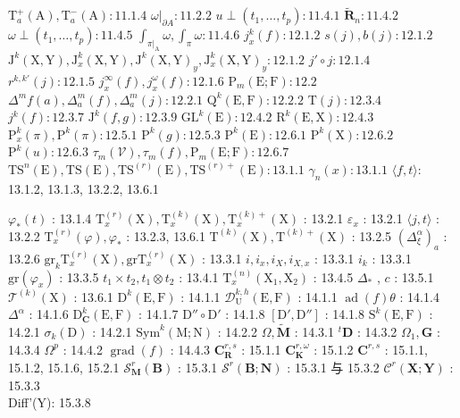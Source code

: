 \(\mathrm{T}_a^+(\mathrm{A}), \mathrm{T}_a^-(\mathrm{A}): 11.1.4\) \(\omega|_{\partial A}: 11.2.2\) \(u \perp (t_1, \ldots, t_p): 11.4.1\) \(\tilde{\mathbf{R}}_n: 11.4.2\) \(\omega \perp (t_1, \ldots, t_p): 11.4.5\) \(\int_{\pi|_{\mathrm{A}}} \omega, \int_{\pi} \omega: 11.4.6\) \(j_x^k(f): 12.1.2\) \(s(j), b(j): 12.1.2\) \(\mathrm{J}^k(\mathrm{X}, \mathrm{Y}), \mathrm{J}_x^k(\mathrm{X}, \mathrm{Y}), \mathrm{J}^k(\mathrm{X}, \mathrm{Y})_y, \mathrm{J}_x^k(\mathrm{X}, \mathrm{Y})_y: 12.1.2\) \(j' \circ j: 12.1.4\) \(r^{k, k'}(j): 12.1.5\) \(j_x^\infty(f), j_x^\omega(f): 12.1.6\) \(\mathrm{P}_m(\mathrm{E}; \mathrm{F}): 12.2\) \(\Delta^m f(a), \Delta_a^m(f), \Delta_a^m(j): 12.2.1\) \(\mathrm{Q}^k(\mathrm{E}, \mathrm{F}): 12.2.2\) \(\mathrm{T}(j): 12.3.4\) \(j^k(f): 12.3.7\) \(\mathrm{J}^k(f, g): 12.3.9\) \(\mathrm{GL}^k(\mathrm{E}): 12.4.2\) \(\mathrm{R}^k(\mathrm{E}, \mathrm{X}): 12.4.3\) \(\mathrm{P}_x^k(\pi), \mathrm{P}^k(\pi): 12.5.1\) \(\mathrm{P}^k(g): 12.5.3\) \(\mathrm{P}^k(\mathrm{E}): 12.6.1\) \(\mathrm{P}^k(\mathrm{X}): 12.6.2\) \(\mathrm{P}^k(u): 12.6.3\) \(\tau_m(\mathcal{V}), \tau_m(f), \mathrm{P}_m(\mathrm{E}; \mathrm{F}): 12.6.7\) \(\mathrm{TS}^n(\mathrm{E}), \mathrm{TS}(\mathrm{E}), \mathrm{TS}^{(r)}(\mathrm{E}), \mathrm{TS}^{(r)+}(\mathrm{E}): 13.1.1\) \(\gamma_n(x): 13.1.1\) \(\langle f, t\rangle\): 13.1.2, 13.1.3, 13.2.2, 13.6.1

\(\varphi_{*}(t)\) : 13.1.4 \(\mathrm{T}_x^{(r)}(\mathrm{X}), \mathrm{T}_x^{(k)}(\mathrm{X}), \mathrm{T}_x^{(k)+}(\mathrm{X})\) : 13.2.1 \(\varepsilon_x\) : 13.2.1 \(\langle j, t \rangle\) : 13.2.2 \(\mathrm{T}_x^{(r)}(\varphi), \varphi_*\) : 13.2.3, 13.6.1 \(\mathrm{T}^{(k)}(\mathrm{X}), \mathrm{T}^{(k)+}(\mathrm{X})\) : 13.2.5 \((\Delta_{\xi}^{\alpha})_a\) : 13.2.6 \(\mathrm{gr}_k \mathrm{T}_x^{(r)}(\mathrm{X}), \mathrm{gr} \mathrm{T}_x^{(r)}(\mathrm{X})\) : 13.3.1 \(i, i_x, i_X, i_{X,x}\) : 13.3.1 \(i_k\) : 13.3.1 \(\mathrm{gr}(\varphi_x)\) : 13.3.5 \(t_1 \times t_2, t_1 \otimes t_2\) : 13.4.1 \(\mathrm{T}_x^{(n)}(\mathrm{X}_1, \mathrm{X}_2)\) : 13.4.5 \(\Delta_*\) , \(c\) : 13.5.1 \(\mathcal{T}^{(k)}(\mathrm{X})\) : 13.6.1 \(\mathrm{D}^k (\mathrm{E}, \mathrm{F})\) : 14.1.1 \(\mathcal{D}_{\mathrm{U}}^{k,h}(\mathrm{E}, \mathrm{F})\) : 14.1.1 \(\operatorname{ad}(f)\theta\) : 14.1.4 \(\Delta^\alpha\) : 14.1.6 \(\mathrm{D}_{\mathbf{C}}^{k}(\mathrm{E}, \mathrm{F})\) : 14.1.7 \(\mathrm{D}'' \circ \mathrm{D}'\) : 14.1.8 \([\mathrm{D}' , \mathrm{D}'']\) : 14.1.8 \(\mathrm{S}^k (\mathrm{E}, \mathrm{F})\) : 14.2.1 \(\sigma_k (\mathrm{D})\) : 14.2.1 \(\mathrm{Sym}^k (\mathrm{M}; \mathrm{N})\) : 14.2.2 \(\Omega, \tilde{\mathbf{M}}\) : 14.3.1 \(^t\mathbf{D}\) : 14.3.2 \(\Omega_1, \mathbf{G}\) : 14.3.4 \(\Omega^p\) : 14.4.2 \(\operatorname{grad}(f)\) : 14.4.3 \(\mathbf{C}_{\mathbf{R}}^{r,s}\) : 15.1.1 \(\mathbf{C}_{\mathbf{K}}^{r,\omega}\) : 15.1.2 \(\mathbf{C}^{r,s}\) : 15.1.1, 15.1.2, 15.1.6, 15.2.1 \(\mathcal{S}_{\mathbf{M}}^r (\mathbf{B})\) : 15.3.1 \(\mathcal{S}^r (\mathbf{B}; \mathbf{N})\) : 15.3.1 与 15.3.2 \(\mathcal{C}^r (\mathbf{X}; \mathbf{Y})\) : 15.3.3\\
Diff'(Y): 15.3.8

